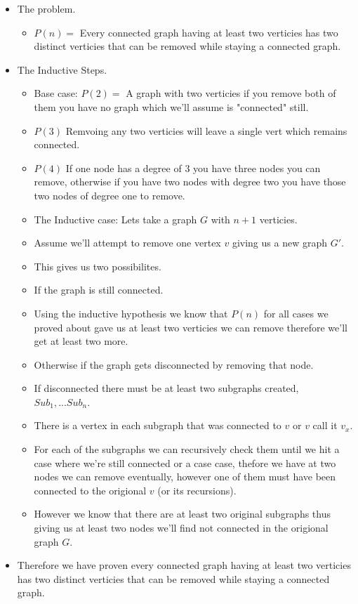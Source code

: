 \documentclass{article}
\begin{document}
\begin{enumerate}
\begin{enumerate}
      \begin{itemize}
        \item The problem.
        \begin{itemize}          
          \item $P(n) = $ Every connected graph having at least two verticies has two distinct verticies that can be removed while staying a connected graph.
        \end{itemize}
        \item The Inductive Steps.
        \begin{itemize}          
          \item Base case: $P(2) = $ A graph with two verticies if you remove both of them you have no graph which we'll assume is "connected" still. 
          \item $P(3)$ Remvoing any two verticies will leave a single vert which remains connected.
          \item $P(4)$ If one node has a degree of 3 you have three nodes you can remove, otherwise if you have two nodes with degree two you have those two nodes of degree one to remove.
          \item The Inductive case: Lets take a graph $G$ with $n + 1$ verticies. 
          \item Assume we'll attempt to remove one vertex $v$ giving us a new graph $G'$. 
          \item This gives us two possibilites.
          \item If the graph is still connected.
          \item Using the inductive hypothesis we know that $P(n)$ for all cases we proved about gave us at least two verticies we can remove therefore we'll get at least two more. 
          \item Otherwise if the graph gets disconnected by removing that node.
          \item If disconnected there must be at least two subgraphs created, $Sub_1, ... Sub_n$. 
          \item There is a vertex in each subgraph that was connected to $v$ or $v$ call it $v_x$.
          \item For each of the subgraphs we can recursively check them until we hit a case where we're still connected or a case case, thefore we have at two nodes we can remove eventually, however one of them must have been connected to the origional $v$ (or its recursions). 
          \item However we know that there are at least two original subgraphs thus giving us at least two nodes we'll find not connected in the origional graph $G$. 
        \end{itemize}
        \item Therefore we have proven every connected graph having at least two verticies has two distinct verticies that can be removed while staying a connected graph.
      \end{itemize}


\end{enumerate}
\end{enumerate}
\end{document}
